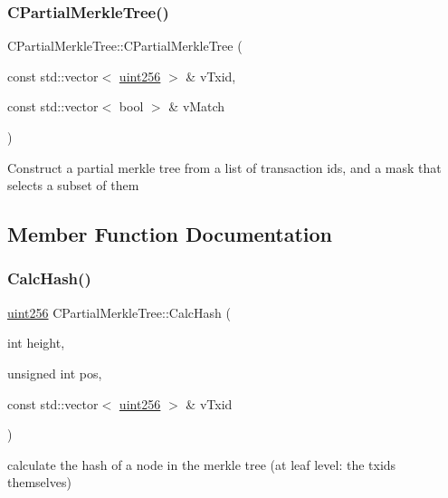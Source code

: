 \subsubsection{\texorpdfstring{C\+Partial\+Merkle\+Tree()}{CPartialMerkleTree()}}
{\footnotesize\ttfamily C\+Partial\+Merkle\+Tree\+::\+C\+Partial\+Merkle\+Tree (\begin{DoxyParamCaption}\item[{const std\+::vector$<$ \mbox{\hyperlink{classuint256}{uint256}} $>$ \&}]{v\+Txid,  }\item[{const std\+::vector$<$ bool $>$ \&}]{v\+Match }\end{DoxyParamCaption})}

Construct a partial merkle tree from a list of transaction id\textquotesingle{}s, and a mask that selects a subset of them 

\subsection{Member Function Documentation}
\mbox{\label{class_c_partial_merkle_tree_a69e7771f95c498f6a340dcc227abcde4}} 
\subsubsection{\texorpdfstring{Calc\+Hash()}{CalcHash()}}
{\footnotesize\ttfamily \mbox{\hyperlink{classuint256}{uint256}} C\+Partial\+Merkle\+Tree\+::\+Calc\+Hash (\begin{DoxyParamCaption}\item[{int}]{height,  }\item[{unsigned int}]{pos,  }\item[{const std\+::vector$<$ \mbox{\hyperlink{classuint256}{uint256}} $>$ \&}]{v\+Txid }\end{DoxyParamCaption})\hspace{0.3cm}{\ttfamily [protected]}}

calculate the hash of a node in the merkle tree (at leaf level\+: the txid\textquotesingle{}s themselves) \mbox{\label{class_c_partial_merkle_tree_a7dd0288d62321fb5aa2c27a3372ee8fe}} 
